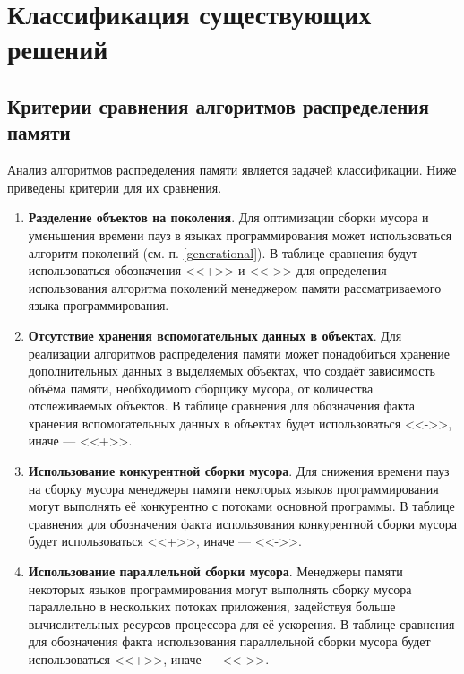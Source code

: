 \chapter{Классификация существующих решений}

\section{Критерии сравнения алгоритмов распределения памяти}

Анализ алгоритмов распределения памяти является задачей классификации. Ниже приведены критерии для их сравнения.

\begin{enumerate}[label*=\arabic*.]
	\item \textbf{Разделение объектов на поколения}. \newline
	Для оптимизации сборки мусора и уменьшения времени пауз в языках программирования может использоваться алгоритм поколений (см. п. \ref{generational}). В таблице сравнения будут использоваться обозначения <<+>> и <<->> для определения использования алгоритма поколений менеджером памяти рассматриваемого языка программирования.
	
	\item \textbf{Отсутствие хранения вспомогательных данных в объектах}. \newline
	Для реализации алгоритмов распределения памяти может понадобиться хранение дополнительных данных в выделяемых объектах, что создаёт зависимость объёма памяти, необходимого сборщику мусора, от количества отслеживаемых объектов. В таблице сравнения для обозначения факта хранения вспомогательных данных в объектах будет использоваться <<->>, иначе --- <<+>>.
	
	\item \textbf{Использование конкурентной сборки мусора}. \newline
	Для снижения времени пауз на сборку мусора менеджеры памяти некоторых языков программирования могут выполнять её конкурентно с потоками основной программы. В таблице сравнения для обозначения факта использования конкурентной сборки мусора будет использоваться <<+>>, иначе --- <<->>.
	
	\item \textbf{Использование параллельной сборки мусора}. \newline
	Менеджеры памяти некоторых языков программирования могут выполнять сборку мусора параллельно в нескольких потоках приложения, задействуя больше вычислительных ресурсов процессора для её ускорения. В таблице сравнения для обозначения факта использования параллельной сборки мусора будет использоваться <<+>>, иначе --- <<->>.
	

\end{enumerate}
